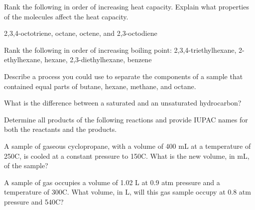 \documentclass[addpoints, 12pt]{exam}
\begin{document}
\begin{questions}
\question[5] Rank the following in order of increasing heat capacity.
Explain what properties of the molecules affect the heat capacity.

2,3,4-octotriene, octane, octene, and 2,3-octodiene
\vspace{1cm}

\question[5] Rank the following in order of increasing boiling point:
2,3,4-triethylhexane, 2-ethylhexane, hexane, 2,3-diethylhexane, benzene 
\newpage


\question[5] Describe a process you could use to separate the components
of a sample that contained equal parts of butane, hexane, methane, and
octane.
\vspace{1cm}

\question[5] What is the difference between a saturated and an
unsaturated hydrocarbon?

\vspace{1cm}

\question[20] Determine all products of the following reactions
and provide IUPAC names for both the reactants and the products.
\begin{parts}
\part

\part 
\vspace{5cm}

\end{parts}
\vspace{5cm}






\question[10] A sample of gaseous cyclopropane, with a volume of 400 mL at a
temperature of 250C, is cooled at a constant pressure to 150C.  What
is the new volume, in mL, of the sample?
\vspace{2cm}


\question[10] A sample of  gas occupies a volume of 1.02 L at 0.9 atm
pressure and a temperature of 300C.  What volume, in L, will this gas
sample occupy at 0.8 atm pressure and 540C?







\end{questions}
\end{document}
